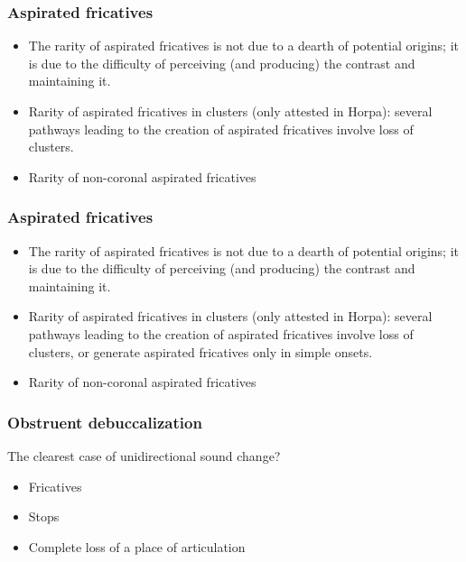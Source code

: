 \documentclass[xcolor=table]{beamer}
\begin{document}
 
 
  \begin{frame} 
\frametitle{Aspirated fricatives} 

\begin{itemize}[<+->]

\item  The rarity of aspirated fricatives is not due to a dearth of potential origins; it is due to the difficulty of perceiving (and producing) the contrast and maintaining it.
\item  Rarity of aspirated fricatives in clusters (only attested in Horpa): several pathways leading to the creation of aspirated fricatives involve loss of clusters.
\item Rarity of non-coronal aspirated fricatives
\end{itemize}

   \end{frame}    


  \begin{frame} 
\frametitle{Aspirated fricatives} 

\begin{itemize}[<+->]

\item  The rarity of aspirated fricatives is not due to a dearth of potential origins; it is due to the difficulty of perceiving (and producing) the contrast and maintaining it.
\item  Rarity of aspirated fricatives in clusters (only attested in Horpa): several pathways leading to the creation of aspirated fricatives involve loss of clusters, or generate aspirated fricatives only in simple onsets.
\item Rarity of non-coronal aspirated fricatives
\end{itemize}

   \end{frame}    


  \begin{frame} 
\frametitle{Obstruent debuccalization} 


The clearest case of unidirectional sound change?

\begin{itemize}

\item  Fricatives
\item  Stops
\item Complete loss of a place of articulation
\end{itemize}

   \end{frame}    
\end{document}
